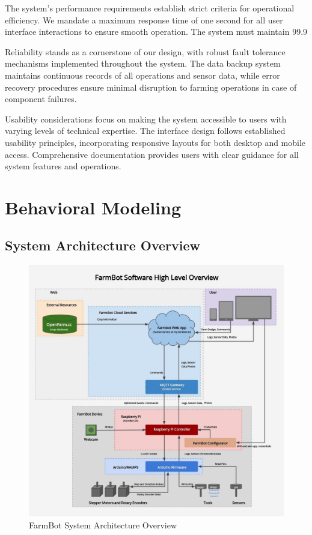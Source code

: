 The system's performance requirements establish strict criteria for operational efficiency. We mandate a maximum response time of one second for all user interface interactions to ensure smooth operation. The system must maintain 99.9%

Reliability stands as a cornerstone of our design, with robust fault tolerance mechanisms implemented throughout the system. The data backup system maintains continuous records of all operations and sensor data, while error recovery procedures ensure minimal disruption to farming operations in case of component failures.

Usability considerations focus on making the system accessible to users with varying levels of technical expertise. The interface design follows established usability principles, incorporating responsive layouts for both desktop and mobile access. Comprehensive documentation provides users with clear guidance for all system features and operations.

\section{Behavioral Modeling}

\subsection{System Architecture Overview}
\begin{figure}[h]
    \centering
    \includegraphics[width=1.0\textwidth]{img/farmbot-architecture.jpg}
    \caption{FarmBot System Architecture Overview}
    \label{fig:system-architecture}
\end{figure}

